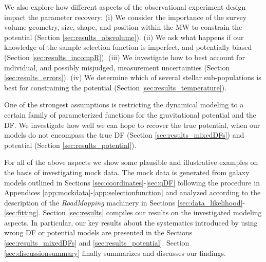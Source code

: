 \documentclass[iop,revtex4,numberedappendix,appendixfloats]{emulateapj}
\newcommand{\RM}{{\sl RoadMapping}}
\begin{document}
We also explore how different aspects of the observational experiment design impact the parameter recovery: (i) We consider the importance of the survey volume geometry, size, shape, and position within the MW to constrain the potential (Section \ref{sec:results_obsvolume}). (ii) We ask what happens if our knowledge of the sample selection function is imperfect, and potentially biased (Section \ref{sec:results_incompR}). (iii) We investigate how to best account for individual, and possibly misjudged, measurement uncertainties (Section \ref{sec:results_errors}). (iv) We determine which of several stellar sub-populations is best for constraining the potential (Section \ref{sec:results_temperature}). 

One of the strongest assumptions is restricting the dynamical modeling to a certain family of parameterized functions for the gravitational potential and the DF. We investigate how well we can hope to recover the true potential, when our models do not encompass the true DF (Section \ref{sec:results_mixedDFs}) and potential (Section \ref{sec:results_potential}).

For all of the above aspects we show some plausible and illustrative examples on the basis of investigating mock data. The mock data is generated from galaxy models outlined in Sections \ref{sec:coordinates}-\ref{sec:qDF} following the procedure in Appendices \ref{app:mockdata}-\ref{app:selectionfunction} and analyzed according to the description of the \RM{} machinery in Sections \ref{sec:data_likelihood}-\ref{sec:fitting}. Section \ref{sec:results} compiles our results on the investigated modeling aspects. In particular, our key results about the systematics introduced by using wrong DF or potential models are presented in the Sections \ref{sec:results_mixedDFs} and \ref{sec:results_potential}. Section \ref{sec:discussionsummary} finally summarizes and discusses our findings.


\end{document}
